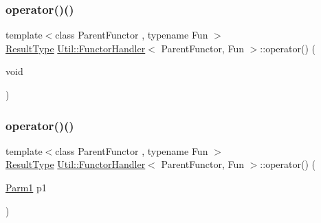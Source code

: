 \mbox{\label{classUtil_1_1FunctorHandler_a568e55043d17f0034572b4ad2772391e}} 
\subsubsection{\texorpdfstring{operator()()}{operator()()}\hspace{0.1cm}{\footnotesize\ttfamily [3/18]}}
{\footnotesize\ttfamily template$<$class Parent\+Functor , typename Fun $>$ \\
\mbox{\hyperlink{classUtil_1_1FunctorHandler_a036da44b8cc2567704cebd2a20d16c80}{Result\+Type}} \mbox{\hyperlink{classUtil_1_1FunctorHandler}{Util\+::\+Functor\+Handler}}$<$ Parent\+Functor, Fun $>$\+::operator() (\begin{DoxyParamCaption}\item[{void}]{ }\end{DoxyParamCaption})\hspace{0.3cm}{\ttfamily [inline]}}

\mbox{\label{classUtil_1_1FunctorHandler_a38485a110bfa7b2fdb5e34553d2f7264}} 
\subsubsection{\texorpdfstring{operator()()}{operator()()}\hspace{0.1cm}{\footnotesize\ttfamily [4/18]}}
{\footnotesize\ttfamily template$<$class Parent\+Functor , typename Fun $>$ \\
\mbox{\hyperlink{classUtil_1_1FunctorHandler_a036da44b8cc2567704cebd2a20d16c80}{Result\+Type}} \mbox{\hyperlink{classUtil_1_1FunctorHandler}{Util\+::\+Functor\+Handler}}$<$ Parent\+Functor, Fun $>$\+::operator() (\begin{DoxyParamCaption}\item[{\mbox{\hyperlink{classUtil_1_1FunctorHandler_a0a902ba40a0ab746f1c29a81d68ae0db}{Parm1}}}]{p1 }\end{DoxyParamCaption})\hspace{0.3cm}{\ttfamily [inline]}}

